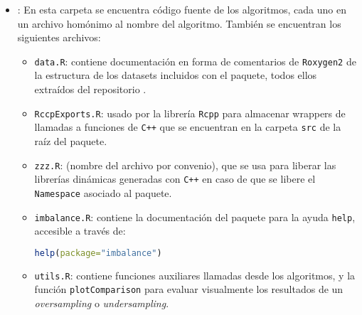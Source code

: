 \begin{itemize}
 \item \R: En esta carpeta se encuentra código fuente de los algoritmos, cada uno en un archivo homónimo al
 nombre del algoritmo. También se encuentran los siguientes archivos:
 
 \begin{itemize}
  \item \texttt{data.R}: contiene documentación en forma de comentarios de \texttt{Roxygen2} de la estructura
    de los datasets incluidos con el paquete, todos ellos extraídos del repositorio .
  \item \texttt{RccpExports.R}: usado por la librería \texttt{Rcpp} para almacenar wrappers de llamadas a funciones
    de \texttt{C++} que se encuentran en la carpeta \texttt{src} de la raíz del paquete.
  \item \texttt{zzz.R}: (nombre del archivo por convenio), que se usa para liberar las librerías dinámicas generadas con 
    \texttt{C++} en caso de que se libere el \texttt{Namespace} asociado al paquete.
  \item \texttt{imbalance.R}: contiene la documentación del paquete para la ayuda \texttt{help}, accesible a través de:
   \begin{lstlisting}[language=R, numbers=none]
   help(package="imbalance")
   \end{lstlisting}
  \item \texttt{utils.R}: contiene funciones auxiliares llamadas desde los algoritmos, y la función \texttt{plotComparison}
    para evaluar visualmente los resultados de un \textit{oversampling} o \textit{undersampling}.
 \end{itemize}
 

\end{itemize}
